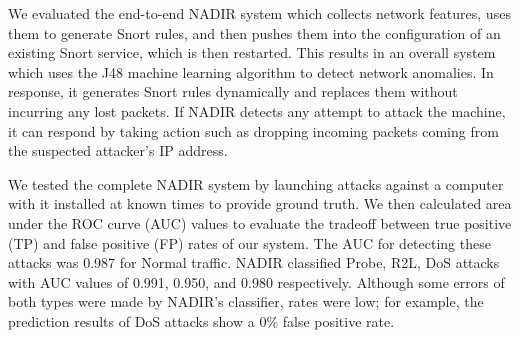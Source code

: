 
We evaluated the end-to-end NADIR system which collects network features, uses them to generate Snort rules, and then pushes them into the configuration of an existing Snort service, which is then 
restarted. This results in an overall system which uses the J48 machine learning algorithm to detect network anomalies. In response, it generates Snort rules dynamically and replaces  them without 
incurring any lost packets. If NADIR detects any attempt to attack the machine, it can respond by taking action such as dropping incoming packets coming from the suspected attacker's IP address.


We tested the complete NADIR system by launching attacks against a computer with it installed at known times to provide ground truth. We then calculated area under the ROC curve (AUC) values to evaluate 
the tradeoff between true positive (TP) and false positive (FP) rates of our system. The AUC for detecting these attacks was 0.987 for Normal traffic. NADIR classified Probe, R2L, DoS attacks with AUC 
values of 0.991, 0.950, and 0.980 respectively. Although some errors of both types were made by NADIR's classifier, rates were low; for example, the prediction results of DoS attacks show a 0\% false 
positive rate.
